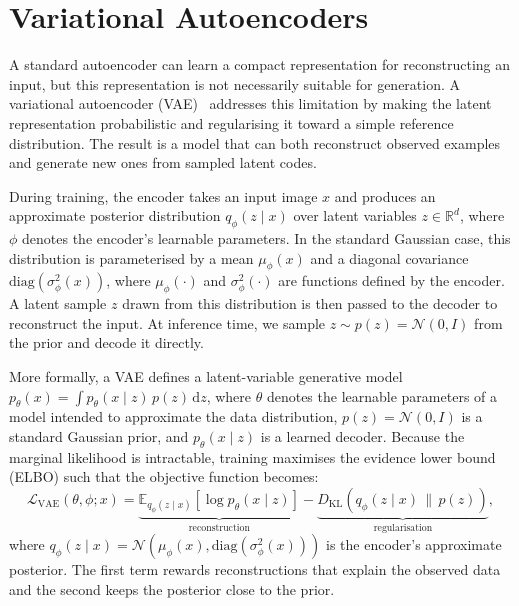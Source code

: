 
\section{Variational Autoencoders}
\label{sec:vae_disentanglement}

A standard autoencoder can learn a compact representation for reconstructing an input, but this representation is not necessarily suitable for generation.
A variational autoencoder (VAE)~\citep{kingma2013auto} addresses this limitation by making the latent
representation probabilistic and regularising it toward a simple reference distribution.
The result is a model that can both reconstruct observed examples and generate new ones
from sampled latent codes.

During training, the encoder takes an input image $x$ and produces an approximate
posterior distribution $q_\phi(z \mid x)$ over latent variables $z \in \mathbb{R}^d$, 
where $\phi$ denotes the encoder's learnable parameters. In the standard Gaussian case, 
this distribution is parameterised by a mean $\mu_\phi(x)$ and a diagonal covariance 
$\mathrm{diag}(\sigma_\phi^2(x))$, where $\mu_\phi(\cdot)$ and $\sigma_\phi^2(\cdot)$ 
are functions defined by the encoder.
A latent sample $z$ drawn from this distribution is
then passed to the decoder to reconstruct the input. At inference time, we sample $z \sim p(z) = \mathcal{N}(0, I)$ from the prior and decode
it directly. 

More formally, a VAE defines a latent-variable generative model
$p_\theta(x) = \int p_\theta(x \mid z)\,p(z)\,\mathrm{d}z$, where $\theta$ denotes the
learnable parameters of a model intended to approximate the data distribution,
$p(z) = \mathcal{N}(0, I)$ is a standard Gaussian prior, and $p_\theta(x \mid z)$ is a
learned decoder. 
Because the
marginal likelihood is intractable, training maximises the evidence lower bound (ELBO) such that the objective function becomes:
\begin{equation}
    \mathcal{L}_{\mathrm{VAE}}(\theta, \phi; x)
    = \underbrace{\mathbb{E}_{q_\phi(z \mid x)}\!\left[\log p_\theta(x \mid z)\right]}_{\text{reconstruction}}
    -\underbrace{D_{\mathrm{KL}}\!\left(q_\phi(z \mid x)\,\|\,p(z)\right)}_{\text{regularisation}},
    \label{eq:elbo}
\end{equation}
where $q_\phi(z \mid x) = \mathcal{N}(\mu_\phi(x), \mathrm{diag}(\sigma^2_\phi(x)))$ is the
encoder's approximate posterior. The first term rewards reconstructions that explain the
observed data and the second keeps the posterior close to the prior.

